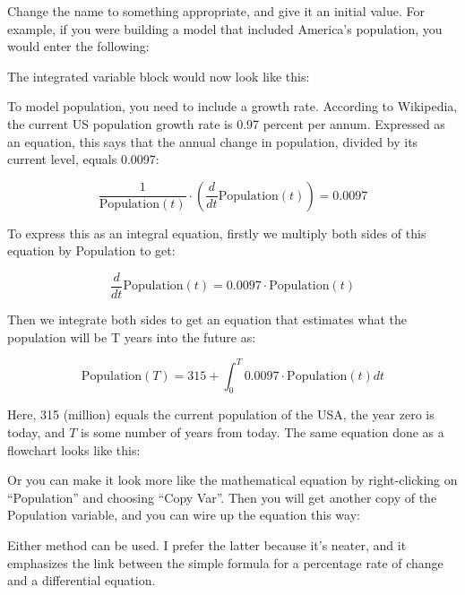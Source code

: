\begin{description}

Change the name to something appropriate, and give it an initial
value. For example, if you were building a model that included
America's population, you would enter the following:



The integrated variable block would now look like this:



To model population, you need to include a growth rate. According to
Wikipedia, the current US population growth rate is 0.97 percent per
annum.  Expressed as an equation, this says that the annual change in
population, divided by its current level, equals 0.0097: 

\begin{displaymath}
\frac{1}{\mathrm{Population}(t)}\cdot\left(\frac{d}{dt}\mathrm{Population}(t)\right)=0.0097
\end{displaymath}

To express this as an integral equation, firstly we multiply both
sides of this equation by Population to get:

\begin{displaymath}
\frac{d}{dt}\mathrm{Population}(t)=0.0097\cdot\mathrm{Population}(t)
\end{displaymath}

Then we integrate both sides to get an equation that estimates what
the population will be T years into the future as:

\begin{displaymath}
\mathrm{Population}(T)=315+\int_0^T 0.0097\cdot\mathrm{Population}(t)
dt
\end{displaymath}

Here, 315 (million) equals the current population of the USA, the year
zero is today, and $T$ is some number of years from today. The same
equation done as a flowchart looks like this: 



Or you can make it look more like the mathematical equation by
right-clicking on ``Population'' and choosing ``Copy Var''. Then you will
get another copy of the Population variable, and you can wire up the
equation this way:


Either method can be used. I prefer the latter because it's neater,
and it emphasizes the link between the simple formula for a percentage
rate of change and a differential equation. 


\end{description}
